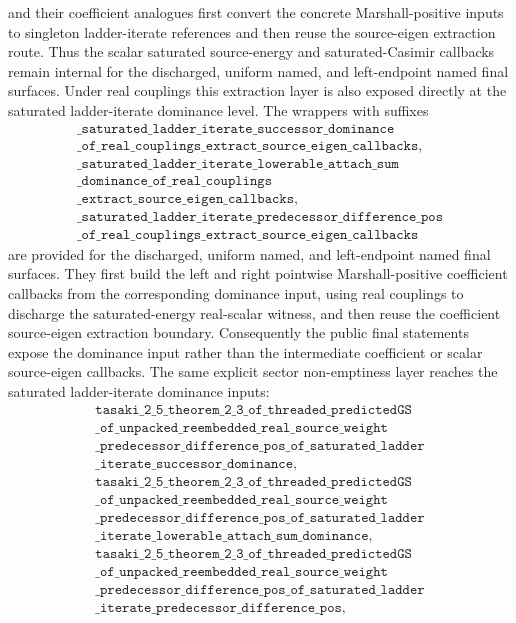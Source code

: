 \documentclass[a4paper,11pt]{article}
\begin{document}
and their coefficient analogues first convert the concrete
Marshall-positive inputs to singleton ladder-iterate references and then
reuse the source-eigen extraction route.  Thus the scalar saturated
source-energy and saturated-Casimir callbacks remain internal for the
discharged, uniform named, and left-endpoint named final surfaces.
Under real couplings this extraction layer is also exposed directly at the
saturated ladder-iterate dominance level.  The wrappers with suffixes
\[
\begin{gathered}
\texttt{\_saturated\_ladder\_iterate\_successor\_dominance}\\
\texttt{\_of\_real\_couplings\_extract\_source\_eigen\_callbacks},\\
\texttt{\_saturated\_ladder\_iterate\_lowerable\_attach\_sum}\\
\texttt{\_dominance\_of\_real\_couplings}\\
\texttt{\_extract\_source\_eigen\_callbacks},\\
\texttt{\_saturated\_ladder\_iterate\_predecessor\_difference\_pos}\\
\texttt{\_of\_real\_couplings\_extract\_source\_eigen\_callbacks}
\end{gathered}
\]
are provided for the discharged, uniform named, and left-endpoint named final
surfaces.  They first build the left and right pointwise
Marshall-positive coefficient callbacks from the corresponding dominance
input, using real couplings to discharge the saturated-energy real-scalar
witness, and then reuse the coefficient source-eigen extraction boundary.
Consequently the public final statements expose the dominance input rather
than the intermediate coefficient or scalar source-eigen callbacks.
The same explicit sector non-emptiness layer reaches the saturated
ladder-iterate dominance inputs:
\[
\begin{gathered}
\texttt{tasaki\_2\_5\_theorem\_2\_3\_of\_threaded\_predictedGS}\\
\texttt{\_of\_unpacked\_reembedded\_real\_source\_weight}\\
\texttt{\_predecessor\_difference\_pos\_of\_saturated\_ladder}\\
\texttt{\_iterate\_successor\_dominance},\\
\texttt{tasaki\_2\_5\_theorem\_2\_3\_of\_threaded\_predictedGS}\\
\texttt{\_of\_unpacked\_reembedded\_real\_source\_weight}\\
\texttt{\_predecessor\_difference\_pos\_of\_saturated\_ladder}\\
\texttt{\_iterate\_lowerable\_attach\_sum\_dominance},\\
\texttt{tasaki\_2\_5\_theorem\_2\_3\_of\_threaded\_predictedGS}\\
\texttt{\_of\_unpacked\_reembedded\_real\_source\_weight}\\
\texttt{\_predecessor\_difference\_pos\_of\_saturated\_ladder}\\
\texttt{\_iterate\_predecessor\_difference\_pos},
\end{gathered}
\]
\end{document}

